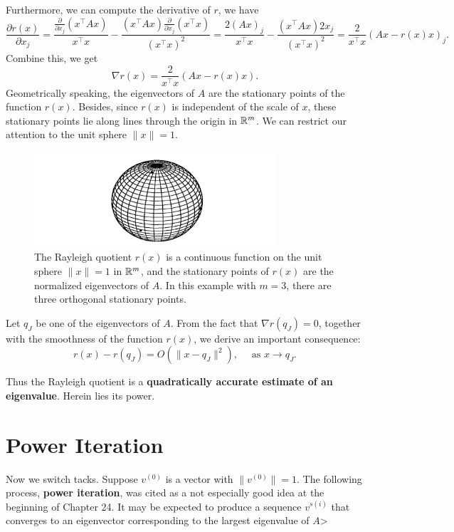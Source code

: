 Furthermore, we can compute the derivative of $r$, we have 
\[
    \frac{\partial r(x)}{\partial x_j} = \frac{\frac{\partial}{\partial x_j}(x^\top Ax)}{x^\top x} - \frac{(x^\top Ax) \frac{\partial}{\partial x_j}(x^\top x)}{(x^\top x)^2} = \frac{2(Ax)_j}{x^\top x} - \frac{(x^\top A x) 2x_j}{(x^\top x)^2} = \frac{2}{x^\top x}(Ax - r(x) x)_j.  
\]
Combine this, we get 
\[
    \nabla r(x) = \frac{2}{x^\top x}(Ax - r(x) x). 
\]
Geometrically speaking, the eigenvectors of $A$ are the stationary points of the function $r(x)$. Besides, since $r(x)$ is independent of the scale of $x$, these stationary points lie along lines through the origin in $\mathbb{R}^m$. We can restrict our attention to the unit sphere $\|x\|=1$.  

\begin{figure}[H]
    \centering
    \includegraphics[width=0.8\textwidth]{figures/27-1.png}
    \caption{The Rayleigh quotient $r(x)$ is a continuous function on the unit sphere $\|x\|=1$ in $\mathbb{R}^m$, and the stationary points of $r(x)$ are the normalized eigenvectors of $A$. In this example with $m=3$, there are three orthogonal stationary points. }
\end{figure}

Let $q_J$ be one of the eigenvectors of $A$. From the fact that $\nabla r(q_J) = 0$, together with the smoothness of the function $r(x)$, we derive an important consequence:
\begin{equation}
\label{eq: quadratic accurate}
r(x) - r(q_J) = O(\|x- q_J\|^2), \quad \text{ as } x \to q_J. 
\end{equation}

Thus the Rayleigh quotient is a \textbf{quadratically accurate estimate of an eigenvalue}. Herein lies its power.  

\section{Power Iteration} 
 Now we switch tacks. Suppose $v^{(0)}$ is a vector with $ \|v^{(0)}\|=1 $. The following process, \textbf{power iteration}, was cited as a not especially good idea at the beginning of Chapter 24. It may be expected to produce a sequence $ v^{s(i)} $ that converges to an eigenvector corresponding to the largest eigenvalue of $A$> 

